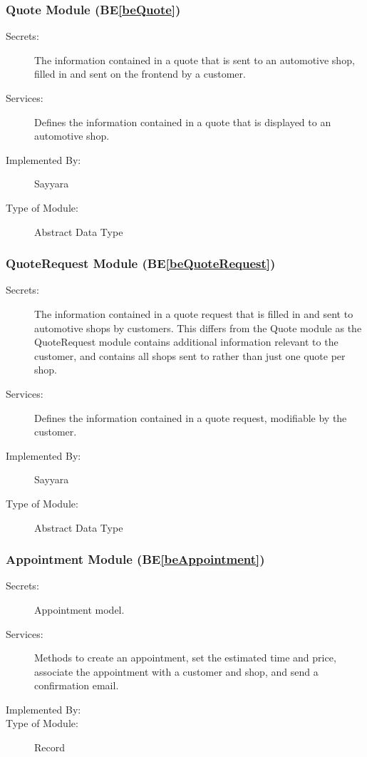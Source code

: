 \documentclass[12pt, titlepage]{article}
\newcommand{\beref}[1]{BE\ref{#1}}
\newcommand{\labelbedef}[1]{\label{be#1def}}
\begin{document}
\subsubsection{Quote Module (\beref{beQuote}) \labelbedef{Quote}}

\begin{description}
\item[Secrets:] The information contained in a quote that is sent to an automotive shop, filled in and sent on the frontend by a customer.
\item[Services:] Defines the information contained in a quote that is displayed to an automotive shop.
\item[Implemented By:] Sayyara
\item[Type of Module:] Abstract Data Type
\end{description}

\subsubsection{QuoteRequest Module (\beref{beQuoteRequest}) \labelbedef{QuoteRequest}}

\begin{description}
\item[Secrets:] The information contained in a quote request that is filled in and sent to automotive shops by customers. This differs from the Quote module as the QuoteRequest module contains additional information relevant to the customer, and contains all shops sent to rather than just one quote per shop.
\item[Services:] Defines the information contained in a quote request, modifiable by the customer.
\item[Implemented By:] Sayyara
\item[Type of Module:] Abstract Data Type
\end{description}

\subsubsection{Appointment Module (\beref{beAppointment}) \labelbedef{Appointment}}

\begin{description}
\item[Secrets:] Appointment model.
\item[Services:] Methods to create an appointment, set the estimated time and price, associate the appointment with a customer and shop, and send a confirmation email.
\item[Implemented By:] \progname
\item[Type of Module:] Record
\end{description}
\end{document}
